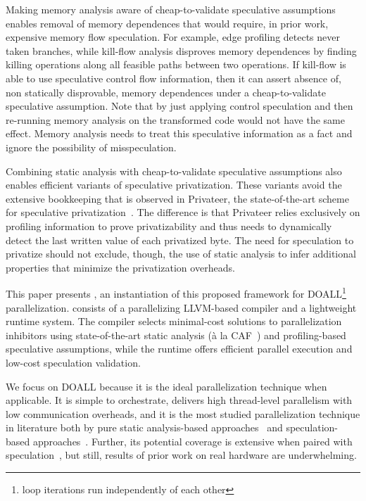 Making memory analysis aware of cheap-to-validate speculative
assumptions enables removal of memory dependences that would require,
in prior work, expensive memory flow speculation.
%
For example, edge profiling detects never taken branches, while
kill-flow analysis disproves memory dependences by finding killing
operations along all feasible paths between two operations. If
kill-flow is able to use speculative control flow information, then it
can assert absence of, non statically disprovable, memory dependences
under a cheap-to-validate speculative assumption.
Note that by just applying control speculation and then re-running
memory analysis on the transformed code would not have the same
effect.  Memory analysis needs to treat this speculative information
as a fact and ignore the possibility of misspeculation.

Combining static analysis with cheap-to-validate speculative
assumptions also enables efficient variants of speculative
privatization.
%
These variants avoid the extensive bookkeeping that is observed in
Privateer, the state-of-the-art scheme for speculative
privatization~\cite{johnson:12:pldi}.
%
The difference is that Privateer relies exclusively on profiling
information to prove privatizability and thus needs to dynamically
detect the last written value of each privatized byte.
%
The need for speculation to privatize should not exclude, though, the
use of static analysis to infer additional properties that minimize
the privatization overheads.

This paper presents \name, an instantiation of this proposed framework
for DOALL\footnote{loop iterations run independently of each other}
parallelization. \name consists of a parallelizing LLVM-based compiler
and a lightweight
runtime system. The compiler selects minimal-cost solutions to
parallelization inhibitors using state-of-the-art static analysis
(\`{a} la CAF~\cite{johnson:cgo:17}) and profiling-based speculative
assumptions, while the runtime offers efficient parallel execution and
low-cost speculation validation.

We focus on DOALL because it is the ideal parallelization technique
when applicable. It is simple to orchestrate, delivers high
thread-level parallelism with low communication overheads, and it is
the most studied parallelization technique in literature both by pure
static analysis-based approaches~\cite{..,.,..} and speculation-based
approaches~\cite{..,..,..,..}.  Further, its potential coverage is
extensive when paired with speculation~\cite{zhong:08:hpca}, but still,
results of prior work on real hardware are underwhelming.


